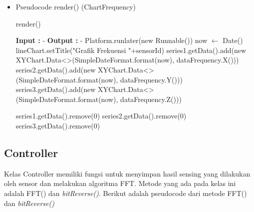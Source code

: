 \begin{itemize}
    \item Pseudocode render() (ChartFrequency)
    \begin{breakablealgorithm}
        \caption{render()}
        \label{alg:renderFrequency}
        \begin{algorithmic}[1]
            \State \textbf{Input :} -
            \State \textbf{Output :} - 
                \State Platform.runlater(new Runnable()){}
                    \State now $\leftarrow$ Date()
                    \State lineChart.setTitle("Grafik Frekuensi "+sensorId)
                    \State series1.getData().add(new XYChart.Data<>(SimpleDateFormat.format(now), dataFrequency.X()))
                    \State series2.getData().add(new XYChart.Data<>(SimpleDateFormat.format(now), dataFrequency.Y()))
                    \State series3.getData().add(new XYChart.Data<>(SimpleDateFormat.format(now), dataFrequency.Z()))
                    
                        \State series1.getData().remove(0)
                        \State series2.getData().remove(0)
                        \State series3.getData().remove(0)
                    \EndIf
                \EndFunction
            \EndFunction
        \end{algorithmic}
    \end{breakablealgorithm}
\end{itemize}

\subsection{Controller}
Kelas Controller memiliki fungsi untuk menyimpan hasil sensing yang dilakukan oleh sensor dan melakukan algoritma FFT. Metode yang ada pada kelas ini adalah FFT() dan \textit{bitReverse()}. Berikut adalah pseudocode dari metode FFT() dan \textit{bitReverse()}


